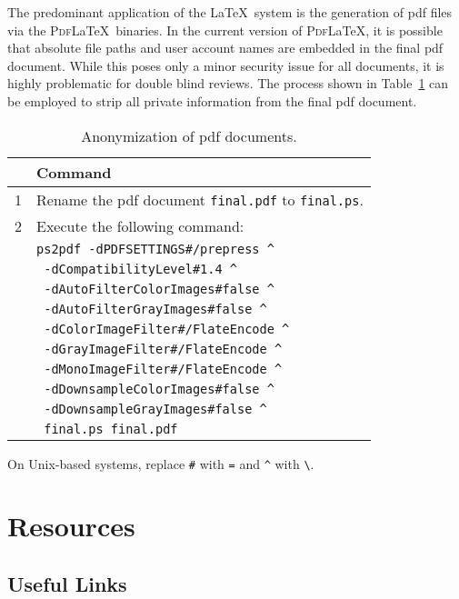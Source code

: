 The predominant application of the \LaTeX\ system is the generation of \gls{pdf} files via the \textsc{Pdf}\LaTeX\ binaries.
In the current version of \textsc{Pdf}\LaTeX, it is possible that absolute file paths and user account names are embedded in the final \gls{pdf} document.
While this poses only a minor security issue for all documents, it is highly problematic for double blind reviews.
The process shown in Table~\ref{tab:ps2pdf} can be employed to strip all private information from the final \gls{pdf} document.

\begin{table}[h]
  \centering
  \begin{tabular}{rl}
  \toprule
  & Command \\
  \midrule
  1 & Rename the \gls{pdf} document \verb|final.pdf| to \verb|final.ps|. \\
  2 & Execute the following command: \\
    & \verb|ps2pdf -dPDFSETTINGS#/prepress ^| \\
    & \verb| -dCompatibilityLevel#1.4 ^| \\
    & \verb| -dAutoFilterColorImages#false ^| \\
    & \verb| -dAutoFilterGrayImages#false ^| \\
    & \verb| -dColorImageFilter#/FlateEncode ^| \\
    & \verb| -dGrayImageFilter#/FlateEncode ^| \\
    & \verb| -dMonoImageFilter#/FlateEncode ^| \\
    & \verb| -dDownsampleColorImages#false ^| \\
    & \verb| -dDownsampleGrayImages#false ^| \\
    & \verb| final.ps final.pdf| \\
  \bottomrule
  \end{tabular}

  On Unix-based systems, replace \verb|#| with \verb|=| and \verb|^| with \verb|\|.
  \caption{Anonymization of \gls{pdf} documents.}
  \label{tab:ps2pdf}
\end{table}

\section{Resources}

\subsection{Useful Links}

